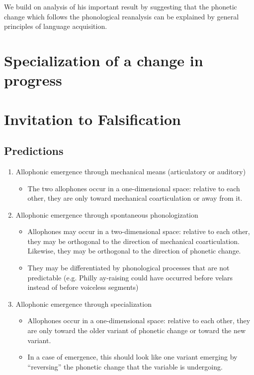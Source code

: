 We build on \citet{fruehwald2013} analysis of his important result by suggesting that the phonetic change which follows the phonological reanalysis can be explained by general principles of language acquisition.

\section{Specialization of a change in progress}
\label{newzea}





\section{Invitation to Falsification}
\label{test}

\subsection{Predictions}
\begin{enumerate}
\item Allophonic emergence through mechanical means (articulatory or auditory)
	\begin{itemize}
		\item The two allophones occur in a one-dimensional space: relative to each other, they are only toward mechanical coarticulation or away from it.
	\end{itemize}
\item Allophonic emergence through spontaneous phonologization
	\begin{itemize}
		\item Allophones may occur in a two-dimensional space: relative to each other, they may be orthogonal to the direction of mechanical coarticulation. Likewise, they may be orthogonal to the direction of phonetic change.
		\item They may be differentiated by phonological processes that are not predictable (e.g. Philly ay-raising could have occurred before velars instead of before voiceless segments)
	\end{itemize}
\item Allophonic emergence through specialization
	\begin{itemize}
		\item Allophones occur in a one-dimensional space: relative to each other, they are only toward the older variant of phonetic change or toward the new variant.
		\item In a case of emergence, this should look like one variant emerging by ``reversing'' the phonetic change that the variable is undergoing.
	\end{itemize}
\end{enumerate}

